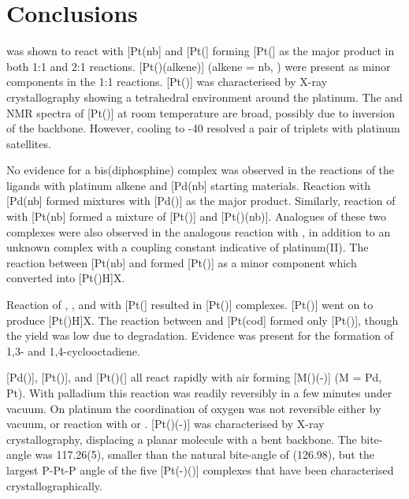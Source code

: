 
\section{Conclusions}

\PhThixantphos{} was shown to react with [Pt(nb] and [Pt(] forming [Pt(\Phthixantphos{}] as the major product in both 1:1 and 2:1 reactions. [Pt(\Phthixantphos)(alkene)] (alkene = nb, ) were present as minor components in the 1:1 reactions.  [Pt(\Phthixantphos)] was characterised by X-ray crystallography showing a tetrahedral environment around the platinum.  The \proton{} and \phosphorus{} NMR spectra of [Pt(\Phthixantphos)] at room temperature are broad, possibly due to inversion of the backbone.  However, cooling to -40\degC{}  resolved a pair of triplets with platinum satellites.  

No evidence for a bis(diphosphine) complex was observed in the reactions of the \tBuxantphos{} ligands with platinum alkene and [Pd(nb] starting materials.  Reaction with [Pd(nb] formed mixtures with [Pd(\tBuxantphos)] as the major product.  Similarly, reaction of \tButhixantphos{} with [Pt(nb] formed a mixture of [Pt(\tButhixantphos)] and [Pt(\tButhixantphos)(nb)].  Analogues of these two complexes were also observed in the analogous reaction with \tBusixantphos{}, in addition to an unknown complex with a coupling constant indicative of platinum(II).  The reaction between [Pt(nb] and \tBuxantphos{} formed [Pt(\tBuxantphos)] as a minor component which converted into [Pt(\tBuxantphos)H]X.  

Reaction of \tBusixantphos{}, \tButhixantphos{}, and \tBuxantphos{} with [Pt(] resulted in [Pt(\tBuxantphos)] complexes.  [Pt(\tBuxantphos)] went on to produce [Pt(\tBuxantphos)H]X.  The reaction between \tButhixantphos{} and [Pt(cod] formed only [Pt(\tButhixantphos)], though the yield was low due to degradation.  Evidence was present for the formation of 1,3- and 1,4-cyclooctadiene.  

[Pd(\tButhixantphos)], [Pt(\tButhixantphos)], and [Pt(\tButhixantphos)(] all react rapidly with air forming [M(\tButhixantphos)(-)] (M = Pd, Pt).  With palladium this reaction was readily reversibly in a few minutes under vacuum.  On platinum the coordination of oxygen was not reversible either by vacuum, or reaction with  or .  [Pt(\tButhixantphos)(-)] was characterised by X-ray crystallography, displacing a planar molecule with a bent \tButhixantphos{} backbone.  The bite-angle was 117.26(5), smaller than the natural bite-angle of (126.98\degrees{}), but the largest P-Pt-P angle of the five [Pt(-)()] complexes that have been characterised crystallographically.  

